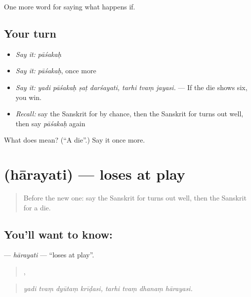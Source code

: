 \begin{grammarlens}[title={What you've built}]
One more word for saying what happens if.
\end{grammarlens}

\subsection*{Your turn}
\begin{itemize}
\raggedright
  \item \emph{Say it:} \emph{pāśakaḥ}
  \item \emph{Say it:} \emph{pāśakaḥ}, once more
  \item \emph{Say it:} \emph{yadi pāśakaḥ ṣaṭ darśayati, tarhi tvaṃ jayasi.} — If the die shows six, you win.
  \item \emph{Recall:} say the Sanskrit for by chance, then the Sanskrit for turns out well, then say \emph{pāśakaḥ} again
\end{itemize}

\begin{tcolorbox}[breakable,colback=teal!4,colframe=teal!35!black,title={Before you move on}]
What does  mean? (\textquotedblleft{}A die\textquotedblright{}.) Say it once more.
\end{tcolorbox}
\section[\texorpdfstring{\sk{हारयति} (hārayati)}{हारयति (hārayati)}]{ (hārayati) — loses at play}

\label{lesson:SA-C537-harayati}



\begin{quote}
Before the new one: say the Sanskrit for turns out well, then the Sanskrit for a die.
\end{quote}

\subsection*{You'll want to know: }
\textbf{} — \emph{hārayati} — \textquotedblleft{}loses at play\textquotedblright{}.

\begin{quote}
   ,    
\end{quote}

\begin{quote}
\emph{yadi tvaṃ dyūtaṃ krīḍasi, tarhi tvaṃ dhanaṃ hārayasi.}
\end{quote}

